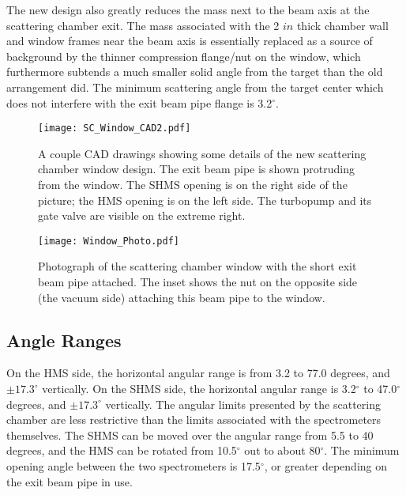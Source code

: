 {The new design also greatly reduces the mass next to the beam axis at
the scattering chamber exit.
The mass associated with the 2 $in$ thick chamber wall and window
frames near the beam axis is essentially replaced as a source of
background by the thinner compression flange/nut on the window, which
furthermore subtends a much smaller solid angle from the target than
the old arrangement did. The minimum scattering angle from the target
center which does not interfere with the exit beam pipe flange is
3.2$^\circ$.

\begin{figure}[!htb]
\begin{center}
\texttt{[image: SC\_Window\_CAD2.pdf]}
\end{center}
\caption[tgt-layout]{ A couple CAD drawings showing some details of
  the new scattering chamber window design. The exit beam pipe is
  shown protruding from the window. The SHMS opening is on the right
  side of the picture; the HMS opening is on the left side. The
  turbopump and its gate valve are visible on the extreme right.}
\label{fig:SC_Window_CAD}
\end{figure}

\begin{figure}[!htb]
\begin{center}
\hspace*{-3.5cm}
\texttt{[image: Window\_Photo.pdf]}
\end{center}
\caption[tgt-layout]{\label{Window_Photo} Photograph of the scattering
  chamber window with the short exit beam pipe attached. The inset
  shows the nut on the opposite side (the vacuum side) attaching this
  beam pipe to the window.}
\end{figure}

\subsection{Angle Ranges}
On the HMS side, the horizontal angular range is from 3.2 to 77.0
degrees, and $\pm 17.3 ^\circ$ vertically. On the SHMS side, the
horizontal angular range is 3.2$^\circ$ to 47.0$^\circ$ degrees, and
$\pm 17.3 ^\circ$ vertically.  The angular limits presented by the
scattering chamber are less restrictive than the limits associated
with the spectrometers themselves. The SHMS can be moved over the
angular range from 5.5 to 40 degrees, and the HMS can be rotated from
10.5$^\circ$ out to about 80$^\circ$. The minimum opening angle
between the two spectrometers is 17.5$^\circ$, or greater depending on
the exit beam pipe in use.

}
